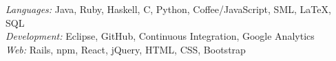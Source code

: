 {\sl Languages:} Java, Ruby, Haskell, C, Python, Coffee/JavaScript, SML,  \LaTeX , SQL \\
{\sl Development:} Eclipse, GitHub, Continuous Integration, Google Analytics \\
{\sl Web:} Rails, npm, React, jQuery, HTML, CSS, Bootstrap

